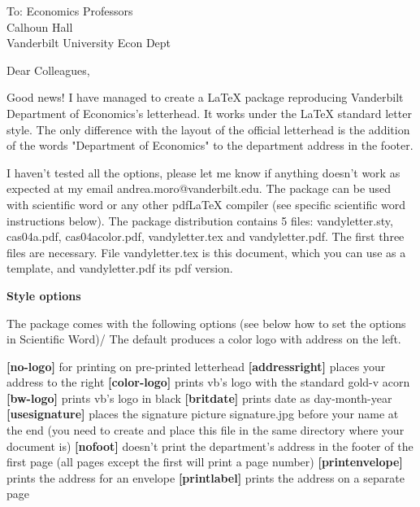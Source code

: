\documentclass{letter}
\begin{document}
\begin{letter}{
To: Economics Professors\\
Calhoun Hall \\
Vanderbilt University Econ Dept}

\opening{
Dear Colleagues,
}


Good news! I have managed to create a LaTeX package reproducing Vanderbilt
Department of Economics's letterhead. It works under the LaTeX standard
letter style. The only difference with the layout of the official letterhead
is the addition of the words "Department of Economics" to the department
address in the footer.

I haven't tested all the options, please let me know if anything doesn't
work as expected at my email andrea.moro@vanderbilt.edu. The package can be
used with scientific word or any other pdfLaTeX compiler (see specific
scientific word instructions below). The package distribution contains 5
files: vandyletter.sty, cas04a.pdf, cas04acolor.pdf, vandyletter.tex and
vandyletter.pdf. The first three files are necessary. File vandyletter.tex
is this document, which you can use as a template, and vandyletter.pdf its
pdf version. \bigskip

\textbf{Style options}

The package comes with the following options (see below how to set the
options in Scientific Word)/ The default produces a color logo with address on the left.

\textbf{[no-logo]} for printing on pre-printed letterhead\vspace{.8ex} \newline 
\textbf{[addressright]} places your address to the right\vspace{.8ex} \newline 
\textbf{[color-logo]} prints vb's logo with the standard gold-v acorn \vspace{.8ex} \newline 
\textbf{[bw-logo]} prints vb's logo in black\vspace{.8ex} \newline 
\textbf{[britdate]} prints date as day-month-year\vspace{.8ex} \newline 
\textbf{[usesignature]} places the signature picture signature.jpg before your name
at the end (you need to create and place this file in the same directory
where your document is)\vspace{.8ex} \newline 
\textbf{[nofoot]} doesn't print the department's address in the footer of the first
page (all pages except the first will print a page number) \vspace{.8ex} \newline 
\textbf{[printenvelope]}
prints the address for an envelope \vspace{.8ex} \newline 
\textbf{[printlabel]} prints the address on a separate page \vspace{.8ex} \newline 



\end{letter}
\end{document}

